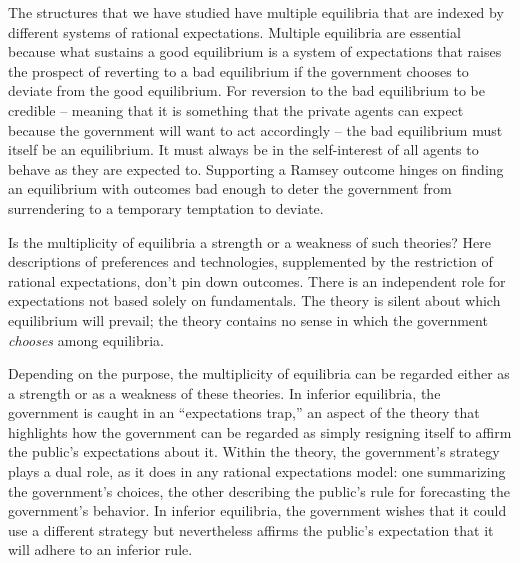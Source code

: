   The structures that we have studied have multiple equilibria that are
indexed by different systems of rational expectations.  Multiple
equilibria are essential because what
sustains a good equilibrium is a system of expectations that
raises the prospect of reverting to a bad equilibrium
if the government chooses to deviate from the good equilibrium.  For
 reversion to the bad equilibrium to be
credible  -- meaning that it is something that the private agents can expect because the
government will want to act accordingly -- the bad equilibrium must itself be an equilibrium.  It must always be in the self-interest of all agents to behave as they
are expected to.  Supporting a Ramsey outcome hinges
on finding an equilibrium with outcomes bad enough to
deter the government from surrendering to a temporary temptation
to deviate.
     


  Is the multiplicity of equilibria a strength or a weakness of such
theories?  Here descriptions of preferences
and technologies, supplemented by the restriction of rational
expectations, don't pin down outcomes. There is an independent role
for expectations not based solely on fundamentals.
  The theory is silent about which
equilibrium will prevail; the theory contains no sense in which the
government {\it chooses\/} among equilibria.

Depending on the
purpose, the multiplicity of equilibria can be regarded either
as a strength or as a weakness of these theories.
  In inferior equilibria, the government is caught in an
``expectations trap,''
an aspect of the theory that highlights how the government
can be regarded as simply resigning itself to
affirm the public's expectations about it.  Within the theory,
the government's strategy plays a dual role, as it does
in any rational expectations model: one summarizing
the government's choices, the other describing the public's
rule for forecasting the government's behavior.
In inferior equilibria, the government  wishes that it  could
use a different strategy but nevertheless
affirms the public's expectation that
it will adhere to an inferior rule.

